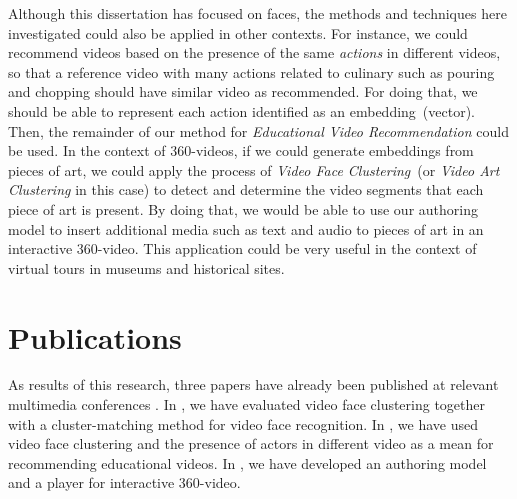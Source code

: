 Although this dissertation has focused on faces, the methods and techniques here investigated could also be applied in other contexts. For instance, we could recommend videos based on the presence of the same \emph{actions} in different videos, so that a reference video with many actions related to culinary such as pouring and chopping should have similar video as recommended. For doing that, we should be able to represent each action identified as an embedding~(vector). Then, the remainder of our method for \emph{Educational Video Recommendation} could be used. In the context of 360-videos, if we could generate embeddings from pieces of art, we could apply the process of \emph{Video Face Clustering}~(or \emph{Video Art Clustering} in this case) to detect and determine the video segments that each piece of art is present. By doing that, we would be able to use our authoring model to insert additional media such as text and audio to pieces of art in an interactive 360-video. This application could be very useful in the context of virtual tours in museums and historical sites.


\section{Publications}

 As results of this research, three papers have already been published at relevant multimedia conferences \cite{mendes2020cluster,mendes2020ISM, mendes2020authoring}. In \cite{mendes2020cluster}, we have evaluated video face clustering together with a cluster-matching method for video face recognition. In \cite{mendes2020ISM}, we have used video face clustering and the presence of actors in different video as a mean for recommending educational videos. In \cite{mendes2020authoring}, we have developed an authoring model and a player for interactive 360-video. 
